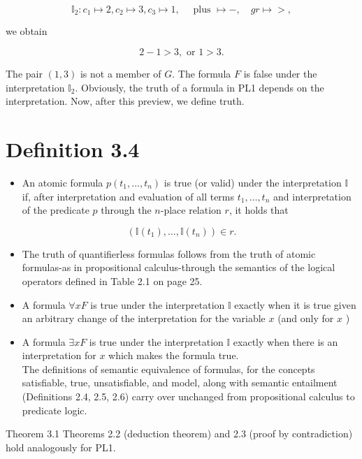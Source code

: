 \documentclass[10pt]{article}
\begin{document}
$$
\mathbb{I}_{2}: c_{1} \mapsto 2, c_{2} \mapsto 3, c_{3} \mapsto 1, \quad \text { plus } \mapsto-, \quad g r \mapsto>,
$$

we obtain

$$
2-1>3, \text { or } 1>3 .
$$

The pair $(1,3)$ is not a member of $G$. The formula $F$ is false under the interpretation $\mathbb{I}_{2}$. Obviously, the truth of a formula in PL1 depends on the interpretation. Now, after this preview, we define truth.

\section*{Definition 3.4}
\begin{itemize}
  \item An atomic formula $p\left(t_{1}, \ldots, t_{n}\right)$ is true (or valid) under the interpretation $\mathbb{I}$ if, after interpretation and evaluation of all terms $t_{1}, \ldots, t_{n}$ and interpretation of the predicate $p$ through the $n$-place relation $r$, it holds that
\end{itemize}

$$
\left(\mathbb{I}\left(t_{1}\right), \ldots, \mathbb{I}\left(t_{n}\right)\right) \in r .
$$

\begin{itemize}
  \item The truth of quantifierless formulas follows from the truth of atomic formulas-as in propositional calculus-through the semantics of the logical operators defined in Table 2.1 on page 25.
  \item A formula $\forall x F$ is true under the interpretation $\mathbb{I}$ exactly when it is true given an arbitrary change of the interpretation for the variable $x$ (and only for $x$ )
  \item A
 formula $\exists x F$ is true under the interpretation $\mathbb{I}$ exactly when there is an interpretation for $x$ which makes the formula true.\\
The definitions of semantic equivalence of formulas, for the concepts satisfiable, true, unsatisfiable, and model, along with semantic entailment (Definitions 2.4, 2.5, 2.6) carry over unchanged from propositional calculus to predicate logic.
\end{itemize}

Theorem 3.1 Theorems 2.2 (deduction theorem) and 2.3 (proof by contradiction) hold analogously for PL1.
\end{document}
